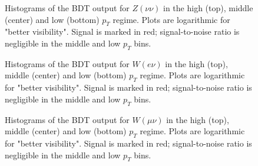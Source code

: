 \documentclass[aps,prb,twocolumn,showpacs,superscriptaddress,groupedaddress]{revtex4}  %
\begin{document}
\begin{figure}
\caption{\label{fig:Znunu} Histograms of the BDT output for $Z(\nu\nu)$ in the high (top), middle (center) and low (bottom) $p_{T}$ regime. Plots are logarithmic for "better visibility". Signal is marked in red; signal-to-noise ratio is negligible in the middle and low $p_{T}$ bins.}
\end{figure}

\begin{figure}
\caption{\label{fig:Wen} Histograms of the BDT output for $W(e\nu)$ in the high (top), middle (center) and low (bottom) $p_{T}$ regime. Plots are logarithmic for "better visibility". Signal is marked in red; signal-to-noise ratio is negligible in the middle and low $p_{T}$ bins.}
\end{figure}

\begin{figure}
\caption{\label{fig:Wmn} Histograms of the BDT output for $W(\mu\nu)$ in the high (top), middle (center) and low (bottom) $p_{T}$ regime. Plots are logarithmic for "better visibility". Signal is marked in red; signal-to-noise ratio is negligible in the middle and low $p_{T}$ bins.}
\end{figure}
\end{document}
